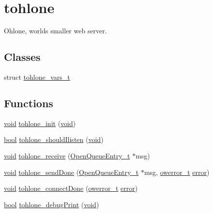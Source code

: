 \hypertarget{group__tohlone}{}\section{tohlone}
\label{group__tohlone}


Ohlone, world\textquotesingle{}s smaller web server.  


\subsection*{Classes}
\begin{DoxyCompactItemize}
\item 
struct \hyperlink{structtohlone__vars__t}{tohlone\+\_\+vars\+\_\+t}
\end{DoxyCompactItemize}
\subsection*{Functions}
\begin{DoxyCompactItemize}
\item 
\hyperlink{usb__devapi_8h_afabf60e7f57651d6d595a02c75f07cd0}{void} \hyperlink{group__tohlone_ga4363b96306607a01f41f991406d8badf}{tohlone\+\_\+init} (\hyperlink{usb__devapi_8h_afabf60e7f57651d6d595a02c75f07cd0}{void})
\item 
\hyperlink{_p_e___types_8h_a97a80ca1602ebf2303258971a2c938e2}{bool} \hyperlink{group__tohlone_gafd23fac181dbf661cf736f8c5bbcec62}{tohlone\+\_\+should\+Ilisten} (\hyperlink{usb__devapi_8h_afabf60e7f57651d6d595a02c75f07cd0}{void})
\item 
\hyperlink{usb__devapi_8h_afabf60e7f57651d6d595a02c75f07cd0}{void} \hyperlink{group__tohlone_ga4d93c4c1100758d92391b3b412794a6c}{tohlone\+\_\+receive} (\hyperlink{struct_open_queue_entry__t}{Open\+Queue\+Entry\+\_\+t} $\ast$msg)
\item 
\hyperlink{usb__devapi_8h_afabf60e7f57651d6d595a02c75f07cd0}{void} \hyperlink{group__tohlone_ga4a37e1c25c7702e4c0b2c09e669c1cc4}{tohlone\+\_\+send\+Done} (\hyperlink{struct_open_queue_entry__t}{Open\+Queue\+Entry\+\_\+t} $\ast$msg, \hyperlink{opendefs_8h_af20b7c3ed9d2ba19e56a309ad9314803}{owerror\+\_\+t} \hyperlink{disk_8c_ad018a3100b2dabad325a0800152db297}{error})
\item 
\hyperlink{usb__devapi_8h_afabf60e7f57651d6d595a02c75f07cd0}{void} \hyperlink{group__tohlone_ga2d8f5d7f7ddd1a8e7f2a2c4aee35f590}{tohlone\+\_\+connect\+Done} (\hyperlink{opendefs_8h_af20b7c3ed9d2ba19e56a309ad9314803}{owerror\+\_\+t} \hyperlink{disk_8c_ad018a3100b2dabad325a0800152db297}{error})
\item 
\hyperlink{_p_e___types_8h_a97a80ca1602ebf2303258971a2c938e2}{bool} \hyperlink{group__tohlone_ga59befd0cdf7da7734c3591d6266c2b88}{tohlone\+\_\+debug\+Print} (\hyperlink{usb__devapi_8h_afabf60e7f57651d6d595a02c75f07cd0}{void})
\end{DoxyCompactItemize}


